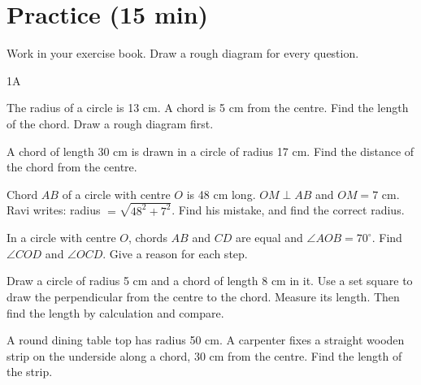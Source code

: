 \section{Practice \normalfont\small(15 min)}

Work in your exercise book. Draw a rough diagram for every question.

\begin{exercise}{1A}
\item The radius of a circle is 13 cm. A chord is 5 cm from the centre. Find the length of the chord. Draw a rough diagram first.
\item A chord of length 30 cm is drawn in a circle of radius 17 cm. Find the distance of the chord from the centre.
\item Chord $AB$ of a circle with centre $O$ is 48 cm long. $OM \perp AB$ and $OM = 7$ cm. Ravi writes: radius $=\sqrt{48^2+7^2}$. Find his mistake, and find the correct radius.
\item In a circle with centre $O$, chords $AB$ and $CD$ are equal and $\angle AOB = 70^\circ$. Find $\angle COD$ and $\angle OCD$. Give a reason for each step.
\item Draw a circle of radius 5 cm and a chord of length 8 cm in it. Use a set square to draw the perpendicular from the centre to the chord. Measure its length. Then find the length by calculation and compare.
\item A round dining table top has radius 50 cm. A carpenter fixes a straight wooden strip on the underside along a chord, 30 cm from the centre. Find the length of the strip.
\end{exercise}



